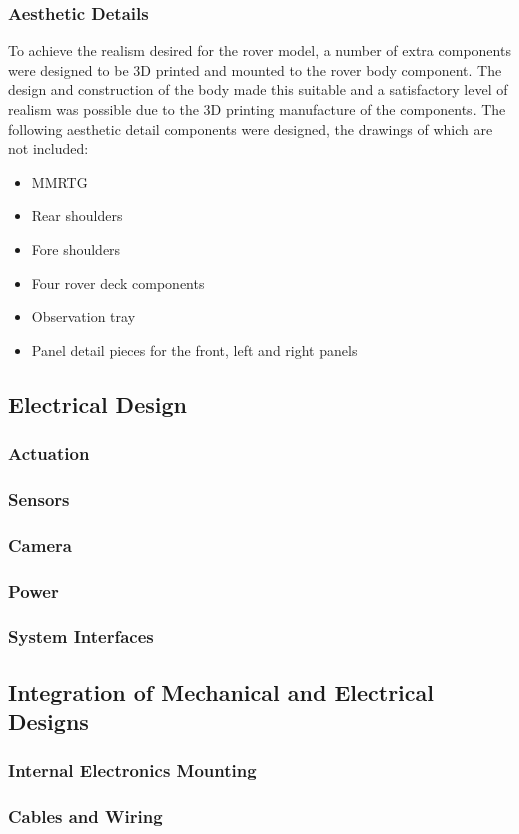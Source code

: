     \subsubsection{Aesthetic Details}
    \label{subsubsec:softDesign-aestheticDetails}
      To achieve the realism desired for the rover model, a number of extra components were designed to be 3D printed and mounted to the rover body component. The design and construction of the body made this suitable and a satisfactory level of realism was possible due to the 3D printing manufacture of the components. The following aesthetic detail components were designed, the drawings of which are not included:
      
      \begin{itemize}
        \item MMRTG
        \item Rear shoulders
        \item Fore shoulders
        \item Four rover deck components
        \item Observation tray
        \item Panel detail pieces for the front, left and right panels
      \end{itemize}
    
  \subsection{Electrical Design}
    \subsubsection{Actuation}
    \subsubsection{Sensors}
    \subsubsection{Camera}
    \subsubsection{Power}
    \subsubsection{System Interfaces}
    
  \subsection{Integration of Mechanical and Electrical Designs}
    \subsubsection{Internal Electronics Mounting}
    \subsubsection{Cables and Wiring}